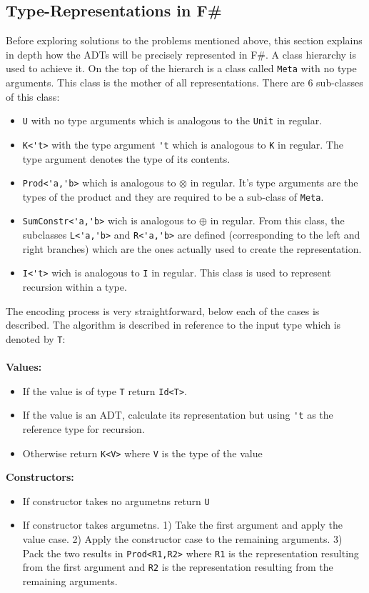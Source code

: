 \documentclass[8pt]{extarticle}
\begin{document}
\subsection{Type-Representations in F\#}
Before exploring solutions to the problems mentioned above, this section explains in depth how the ADTs will be precisely represented in F\#. A class hierarchy is used to achieve it. On the top of the hierarch is a class called \verb+Meta+ with no type arguments. This class is the mother of all representations. There are 6 sub-classes of this class:
\begin{itemize}
  \item \verb+U+ with no type arguments which is analogous to the \verb+Unit+ in regular.
  \item \verb+K<'t>+ with the type argument \verb+'t+ which is analogous to \verb+K+ in regular. The type argument denotes the type of its contents.
  \item \verb+Prod<'a,'b>+ which is analogous to $\otimes$ in regular. It's type arguments are the types of the product and they are required to be a sub-class of \verb+Meta+.
  \item \verb+SumConstr<'a,'b>+ wich is analogous to $\oplus$ in regular. From this class, the subclasses \verb+L<'a,'b>+ and \verb+R<'a,'b>+ are defined (corresponding to the left and right branches) which are the ones actually used to create the representation.
  \item \verb+I<'t>+ wich is analogous to \verb+I+ in regular. This class is used to represent recursion within a type.
\end{itemize}
The encoding process is very straightforward, below each of the cases is described. The algorithm is described in reference to the input type which is denoted by \verb+T+:
\\\\{\bf Values:}
\begin{itemize}
\item If the value is of type \verb+T+ return \verb+Id<T>+.
\item If the value is an ADT, calculate its representation but using \verb+'t+ as the reference type for recursion.
\item Otherwise return \verb+K<V>+ where \verb+V+ is the type of the value
\end{itemize}
{\bf Constructors:}
\begin{itemize}
\item If constructor takes no argumetns return \verb+U+
\item If constructor takes argumetns. 1) Take the first argument and apply the value case. 2) Apply the constructor case to the remaining arguments. 3) Pack the two results in \verb+Prod<R1,R2>+ where \verb+R1+ is the representation resulting from the first argument and \verb+R2+ is the representation resulting from the remaining arguments.
\end{itemize}
\end{document}
